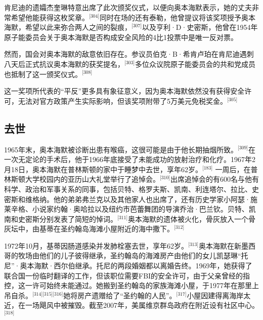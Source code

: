 肯尼迪的遗孀杰奎琳特意出席了此次颁奖仪式，以便向奥本海默表示，她的丈夫非常希望他能获得这枚奖章。\(^\text{[304]}\)同时在场的还有泰勒，他曾提议将该奖项授予奥本海默，希望以此来弥合两人之间的裂痕，\(^\text{[307]}\)以及亨利·D·史密斯，他曾在1954年原子能委员会关于奥本海默是否构成安全风险的4比1投票中是唯一反对票。

然而，国会对奥本海默的敌意依旧存在。参议员伯克·B·希肯卢珀在肯尼迪遇刺八天后正式抗议奥本海默的获奖提名，\(^\text{[303]}\)多位众议院原子能委员会的共和党成员也抵制了这一颁奖仪式。\(^\text{[308]}\)

这一奖项所代表的“平反”更多具有象征意义，因为奥本海默依然没有获得安全许可，无法对官方政策产生实际影响，但该奖项附带了5万美元免税奖金。\(^\text{[305]}\)
\subsection{去世}
1965年末，奥本海默被诊断出患有喉癌，这很可能是由于他长期抽烟所致。\(^\text{[309]}\)在一次无定论的手术后，他于1966年底接受了未能成功的放射治疗和化疗。1967年2月18日，奥本海默在普林斯顿的家中于睡梦中去世，享年62岁。\(^\text{[183]}\) 一周后，在普林斯顿大学校园内的亚历山大礼堂举行了追悼会。\(^\text{[310]}\)出席追悼会的有600名与他有科学、政治和军事关系的同事，包括贝特、格罗夫斯、凯南、利连塔尔、拉比、史密斯和维格纳。他的弟弟弗兰克以及其他家人也出席了，还有历史学家小阿瑟·施莱辛格、小说家约翰·奥哈拉以及纽约市芭蕾舞团的导演乔治·巴兰钦。贝特、凯南和史密斯分别发表了简短的悼词。\(^\text{[311]}\)奥本海默的遗体被火化，骨灰放入一个骨灰坛中，由基蒂在圣约翰岛海滩小屋附近的海中撒下。\(^\text{[312]}\)

1972年10月，基蒂因肠道感染并发肺栓塞去世，享年62岁。\(^\text{[313]}\)奥本海默在新墨西哥的牧场由他们的儿子彼得继承，圣约翰岛的海滩房产由他们的女儿凯瑟琳“托尼”·奥本海默·西尔伯继承。托尼的两段婚姻都以离婚告终。1969年，她获得了联合国一份临时翻译的工作，但该职位需要FBI的安全许可，由于父亲曾经的指控，这一许可始终未能通过。她搬到圣约翰岛的家族海滩小屋，于1977年在那里上吊自杀。\(^\text{[314][315][316]}\)她将房产遗赠给了“圣约翰的人民”。\(^\text{[317]}\)小屋因建得离海岸太近，在一场飓风中被摧毁。截至2007年，美属维京群岛政府在附近设有社区中心。\(^\text{[318]}\)
